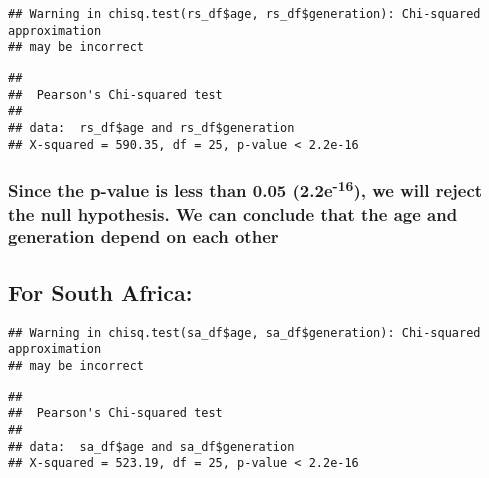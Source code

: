 \documentclass[
]{article}
\newenvironment{Shaded}{\begin{snugshade}}{\end{snugshade}}
\newcommand{\FunctionTok}[1]{\textcolor[rgb]{0.00,0.00,0.00}{#1}}
\newcommand{\NormalTok}[1]{#1}
\newcommand{\SpecialCharTok}[1]{\textcolor[rgb]{0.00,0.00,0.00}{#1}}
\begin{document}
\begin{verbatim}
## Warning in chisq.test(rs_df$age, rs_df$generation): Chi-squared approximation
## may be incorrect
\end{verbatim}

\begin{verbatim}
## 
##  Pearson's Chi-squared test
## 
## data:  rs_df$age and rs_df$generation
## X-squared = 590.35, df = 25, p-value < 2.2e-16
\end{verbatim}

\hypertarget{since-the-p-value-is-less-than-0.05-2.2e-16-we-will-reject-the-null-hypothesis.-we-can-conclude-that-the-age-and-generation-depend-on-each-other-5}{%
\subsubsection{\texorpdfstring{Since the p-value is less than 0.05
(2.2e\textsuperscript{-16}), we will reject the null hypothesis. We can
conclude that the age and generation depend on each
other}{Since the p-value is less than 0.05 (2.2e-16), we will reject the null hypothesis. We can conclude that the age and generation depend on each other}}\label{since-the-p-value-is-less-than-0.05-2.2e-16-we-will-reject-the-null-hypothesis.-we-can-conclude-that-the-age-and-generation-depend-on-each-other-5}}

\hypertarget{for-south-africa-1}{%
\subsection{For South Africa:}\label{for-south-africa-1}}

\begin{Shaded}
\end{Shaded}

\begin{verbatim}
## Warning in chisq.test(sa_df$age, sa_df$generation): Chi-squared approximation
## may be incorrect
\end{verbatim}

\begin{verbatim}
## 
##  Pearson's Chi-squared test
## 
## data:  sa_df$age and sa_df$generation
## X-squared = 523.19, df = 25, p-value < 2.2e-16
\end{verbatim}
\end{document}
